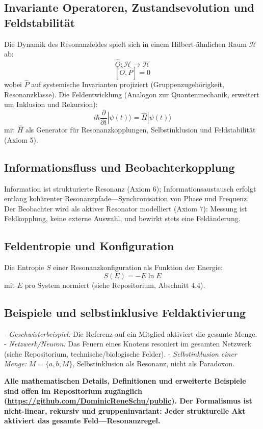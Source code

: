 \documentclass[12pt]{article}
\begin{document}
\subsection{Invariante Operatoren, Zustandsevolution und Feldstabilität}

Die Dynamik des Resonanzfeldes spielt sich in einem Hilbert-ähnlichen Raum $\mathcal{H}$ ab:
\[
\hat{O} : \mathcal{H} \to \mathcal{H}
\]
\[
[\hat{O}, \hat{P}] = 0
\]
wobei $\hat{P}$ auf systemische Invarianten projiziert (Gruppenzugehörigkeit, Resonanzklasse). Die Feldentwicklung (Analogon zur Quantenmechanik, erweitert um Inklusion und Rekursion):
\[
i\hbar \frac{\partial}{\partial t} |\psi(t)\rangle = \hat{H} |\psi(t)\rangle
\]
mit $\hat{H}$ als Generator für Resonanzkopplungen, Selbstinklusion und Feldstabilität (Axiom 5).

\subsection{Informationsfluss und Beobachterkopplung}

Information ist strukturierte Resonanz (Axiom 6); Informationsaustausch erfolgt entlang kohärenter Resonanzpfade—Synchronisation von Phase und Frequenz. Der Beobachter wird als aktiver Resonator modelliert (Axiom 7): Messung ist Feldkopplung, keine externe Auswahl, und bewirkt stets eine Feldänderung.

\subsection{Feldentropie und Konfiguration}

Die Entropie $S$ einer Resonanzkonfiguration als Funktion der Energie:
\[
S(E) = -E \ln E
\]
mit $E$ pro System normiert (siehe Repositorium, Abschnitt 4.4).

\subsection{Beispiele und selbstinklusive Feldaktivierung}

- \textit{Geschwisterbeispiel:} Die Referenz auf ein Mitglied aktiviert die gesamte Menge.
- \textit{Netzwerk/Neuron:} Das Feuern eines Knotens resoniert im gesamten Netzwerk (siehe Repositorium, technische/biologische Felder).
- \textit{Selbstinklusion einer Menge:} $M = \{a, b, M\}$, Selbstinklusion als Resonanz, nicht als Paradoxon.

\medskip

\textbf{Alle mathematischen Details, Definitionen und erweiterte Beispiele sind offen im Repositorium zugänglich (\url{https://github.com/DominicReneSchu/public}). Der Formalismus ist nicht-linear, rekursiv und gruppeninvariant: Jeder strukturelle Akt aktiviert das gesamte Feld—Resonanzregel.}
\end{document}
